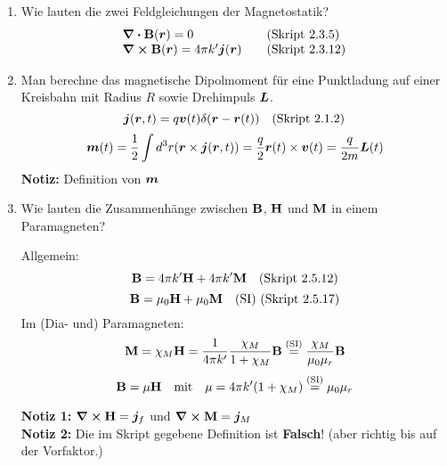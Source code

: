 \begin{enumerate}
  \item Wie lauten die zwei Feldgleichungen der Magnetostatik? %
    \begin{equation*}
      \begin{array}{ll}
        \div \vb B(\vb* r) = 0&\quad\text{(Skript 2.3.5)}\\
        \curl \vb B(\vb* r)= 4\pi k'\vb* j(\vb* r)&\quad\text{(Skript 2.3.12)}
      \end{array}
    \end{equation*}

  \item Man berechne das magnetische Dipolmoment für eine Punktladung %
    auf 
        einer Kreisbahn mit Radius $R$ sowie Drehimpuls $\vb* L$.
        $$\vb* j(\vb* r,t)=q\vb* v(t)\delta(\vb* r-\vb* r(t))\quad\text{(Skript 2.1.2)}$$
        $$\vb* m(t) 
        = \frac{1}{2}\int d^3 r (\vb* r \times \vb* j(\vb* r,t))
        =\frac{q}{2}\vb* r(t)\times\vb* v(t)=\frac{q}{2m}\vb* L(t)$$
        \textbf{Notiz:} Definition von $\vb* m$ 

  \item Wie lauten die Zusammenhänge zwischen $\vb B$, $\vb H$  %
        und $\vb M$ in einem Paramagneten?

        Allgemein:
        $$\vb B = 4\pi k'\vb H + 4\pi k'\vb M\quad\text{(Skript 2.5.12)}$$
        $$\vb B = \mu_0 \vb H + \mu_0 \vb M \quad\text{(SI) 
        (Skript 2.5.17)}$$
        Im (Dia- und) Paramagneten:
        \begin{equation*}
            \vb M 
            = \chi_M \vb H 
            = \frac{1}{4\pi k'}\frac{\chi_M}{1+\chi_M} \vb B
            \stackrel{\text{(SI)}}= \frac{\chi_M}{\mu_0\mu_r} \vb B
        \end{equation*}
         \begin{equation*}
            \vb B = \mu \vb H \quad \text{mit}\quad
            \mu = 4\pi k'(1+\chi_M)
            \stackrel{\text{(SI)}}= {\mu_0\mu_r} 
         \end{equation*}
          \begin{center}
          \end{center}

        \textbf{Notiz 1:} $\displaystyle \curl \vb H = \vb* j_f$ und 
        $\displaystyle \curl \vb M=\vb* j_M$\\
        \textbf{Notiz 2:} Die im Skript gegebene Definition ist 
        \textbf{Falsch}! (aber richtig bis auf der Vorfaktor.)
\end{enumerate}
